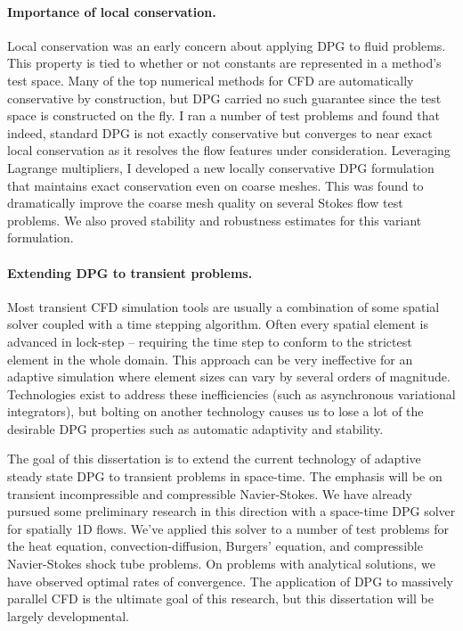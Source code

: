 \documentclass[letterpaper]{article}
\begin{document}
\paragraph{Importance of local conservation.}
Local conservation was an early concern about applying DPG to fluid problems. 
This property is tied to whether or not constants are represented in a method's test space.
Many of the top numerical methods for CFD are automatically conservative by construction, 
but DPG carried no such guarantee since the test space is constructed on the fly.
I ran a number of test problems and found that indeed, standard DPG is not exactly conservative but converges to near exact local conservation 
as it resolves the flow features under consideration.
Leveraging Lagrange multipliers, I developed a new locally conservative DPG formulation\cite{EllisLC} 
that maintains exact conservation even on coarse meshes.
This was found to dramatically improve the coarse mesh quality on several Stokes flow test problems.
We also proved stability and robustness estimates for this variant formulation.

\paragraph{Extending DPG to transient problems.}
Most transient CFD simulation tools are usually a combination of some spatial solver coupled with a time stepping algorithm.
Often every spatial element is advanced in lock-step -- requiring the time step to conform to the strictest element in the whole domain.
This approach can be very ineffective for an adaptive simulation where element sizes can vary by several orders of magnitude.
Technologies exist to address these inefficiencies (such as asynchronous variational integrators\cite{Lew2003}), but bolting on another technology
causes us to lose a lot of the desirable DPG properties such as automatic adaptivity and stability.

The goal of this dissertation is to extend the current technology of adaptive steady state DPG to transient problems in space-time.
The emphasis will be on transient incompressible and compressible Navier-Stokes.
We have already pursued some preliminary research in this direction with a space-time DPG solver for spatially 1D flows.
We've applied this solver to a number of test problems for the heat equation, convection-diffusion, Burgers' equation, 
and compressible Navier-Stokes shock tube problems.
On problems with analytical solutions, we have observed optimal rates of convergence.
The application of DPG to massively parallel CFD is the ultimate goal of this research, but this dissertation will be largely developmental.
\end{document}
